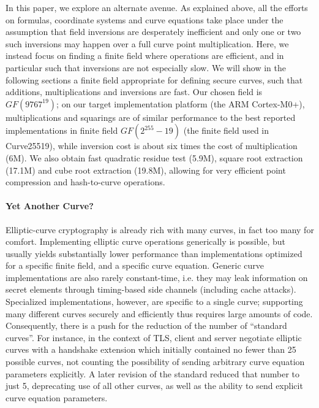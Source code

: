 \documentclass{llncs}
\newcommand{\GF}{GF}
\begin{document}
In this paper, we explore an alternate avenue. As explained above, all
the efforts on formulas, coordinate systems and curve equations take
place under the assumption that field inversions are desperately
inefficient and only one or two such inversions may happen over a full
curve point multiplication. Here, we instead focus on finding a finite
field where operations are efficient, and in particular such that
inversions are not especially slow. We will show in the following
sections a finite field appropriate for defining secure curves, such
that additions, multiplications and inversions are fast. Our chosen
field is $\GF(9767^{19})$; on our target implementation platform (the
ARM Cortex-M0+), multiplications and squarings are of similar
performance to the best reported implementations in finite field
$\GF(2^{255}-19)$ (the finite field used in Curve25519), while inversion
cost is about six times the cost of multiplication (6M). We also obtain
fast quadratic residue test (5.9M), square root extraction (17.1M) and
cube root extraction (19.8M), allowing for very efficient point
compression and hash-to-curve operations.

\paragraph{Yet Another Curve?}

Elliptic-curve cryptography is already rich with many curves, in fact
too many for comfort. Implementing elliptic curve operations generically
is possible, but usually yields substantially lower performance than
implementations optimized for a specific finite field, and a specific
curve equation. Generic curve implementations are also rarely
constant-time, i.e. they may leak information on secret elements through
timing-based side channels (including cache attacks). Specialized
implementations, however, are specific to a single curve; supporting
many different curves securely and efficiently thus requires large
amounts of code. Consequently, there is a push for the reduction of the
number of ``standard curves''. For instance, in the context of TLS,
client and server negotiate elliptic curves with a handshake extension
which initially contained no fewer than 25 possible curves, not counting
the possibility of sending arbitrary curve equation parameters
explicitly\cite{ECTLSrfc4492}. A later revision of the standard reduced
that number to just 5, deprecating use of all other curves, as well as
the ability to send explicit curve equation
parameters\cite{ECTLSrfc8422}.
\end{document}
